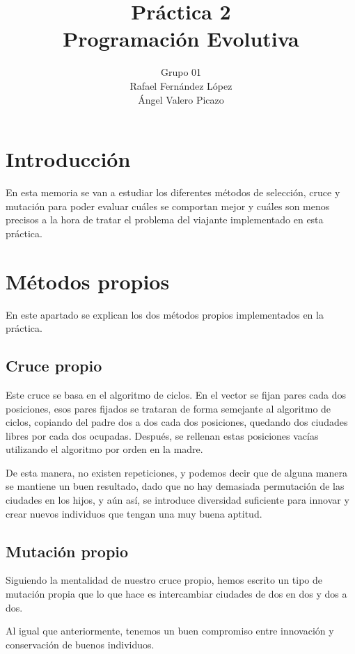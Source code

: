 \documentclass[12pt]{article}
\title{Práctica 2\\Programación Evolutiva}
\author{Grupo 01\\Rafael Fernández López\\Ángel Valero Picazo}
\date{}
\begin{document}
\maketitle
\newpage
\newpage
\tableofcontents
\newpage

\section{Introducción}

	En esta memoria se van a estudiar los diferentes métodos de selección, cruce y mutación para poder
    evaluar cuáles se comportan mejor y cuáles son menos precisos a la hora de tratar el problema del
    viajante implementado en esta práctica.

\section{Métodos propios}

	En este apartado se explican los dos métodos propios implementados en la práctica.

\subsection{Cruce propio}

	Este cruce se basa en el algoritmo de ciclos. En el vector se fijan pares cada dos posiciones,
    esos pares fijados se trataran de forma semejante al algoritmo de ciclos, copiando del padre dos
    a dos cada dos posiciones, quedando dos ciudades libres por cada dos ocupadas. Después, se rellenan
    estas posiciones vacías utilizando el algoritmo por orden en la madre.

    De esta manera, no existen repeticiones, y podemos decir que de alguna manera se mantiene un buen resultado, dado que no hay
    demasiada permutación de las ciudades en los hijos, y aún así, se introduce diversidad suficiente
    para innovar y crear nuevos individuos que tengan una muy buena aptitud.

\subsection{Mutación propio}

    Siguiendo la mentalidad de nuestro cruce propio, hemos escrito un tipo de mutación propia que lo
    que hace es intercambiar ciudades de dos en dos y dos a dos.

    Al igual que anteriormente, tenemos un buen compromiso entre innovación y conservación de buenos
    individuos.
    
\end{document}
